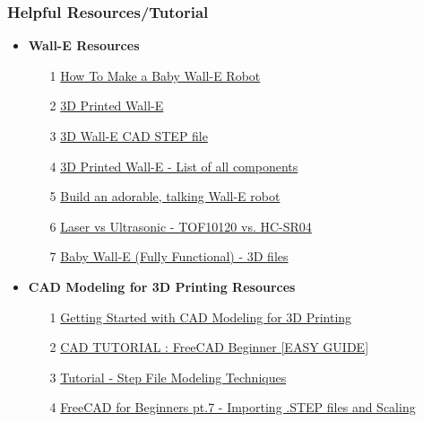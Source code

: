 \documentclass[12pt]{article}
\begin{document}
\subsubsection{Helpful Resources/Tutorial} %
\begin{itemize}
    \item \textbf{Wall-E Resources}
    \begin{itemize}
        \item[1] \href{https://www.youtube.com/watch?v=Cqv2w0qYf-s}{How To Make a Baby Wall-E Robot} 
        \item[2] \href{https://wired.chillibasket.com/3d-printed-wall-e/}{3D Printed Wall-E} 
        \item[3] \href{https://drive.google.com/drive/folders/1AiicgyjlS-KWhi7NfhnoCsdB6uxxlqcq?usp=sharing}{3D Wall-E CAD STEP file} 
        \item[4] \href{https://wired.chillibasket.com/wp-content/uploads/2019/06/Wall-E-List-of-Parts.pdf}{3D Printed Wall-E - List of all components }
        \item[5] \href{https://blog.arduino.cc/2021/07/03/build-your-own-adorable-talking-wall-e-robot/}{Build an adorable, talking Wall-E robot}
        \item[6] \href{https://www.youtube.com/watch?v=xO5_3SjEhS4}{Laser vs Ultrasonic - TOF10120 vs. HC-SR04}
        \item[7] \href{https://www.thingiverse.com/thing:5957438/files}{Baby Wall-E (Fully Functional) - 3D files}
    \end{itemize}
    
    \item \textbf{CAD Modeling for 3D Printing Resources}
    \begin{itemize}
        \item[1] \href{https://www.youtube.com/watch?v=IUoTKbGAlhk}{Getting Started with CAD Modeling for 3D Printing}
        \item[2] \href{https://www.youtube.com/watch?v=1QNVyMBV0fM}{CAD TUTORIAL : FreeCAD Beginner [EASY GUIDE]}
        \item[3]  \href{https://www.youtube.com/watch?v=vK-O7hwKYYQ}{Tutorial - Step File Modeling Techniques}
        \item[4] \href{https://www.youtube.com/watch?v=Ae5O7j-hFwg}{FreeCAD for Beginners pt.7 - Importing .STEP files and Scaling}
    \end{itemize}
    

\end{itemize}
\end{document}
